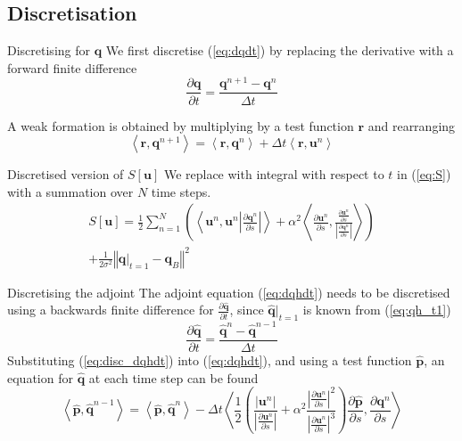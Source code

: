 \documentclass{beamer}
\newcommand{\eq}[1]{(\ref{eq:#1})}
\newcommand{\vect}[1]{\ensuremath{\mathbf{#1}}}
\newcommand{\hvect}[1]{\ensuremath{\hat{\vect{#1}}}}
\newcommand{\pp}[2]{\frac{\partial #1}{\partial #2}}
\newcommand{\angles}[1]{\left\langle #1 \right\rangle}
\begin{document}
\subsection{Discretisation}
\begin{frame}{Discretising for $\vect q$}
We first discretise \eq{dqdt} by replacing the derivative with a forward finite
difference
\begin{equation}
  \label{eq:disc_dqdt}
  \pp{\vect q}{t} = \frac{\vect q^{n+1} - \vect q^n}{\Delta t}
\end{equation}

A weak formation is obtained by multiplying by a test function $\vect r$ and
rearranging
\begin{equation}
  \label{eq:disc_q}
  \angles{\vect r, \vect q^{n+1}} = \angles{\vect r, \vect q^n} + \Delta t
    \angles{\vect r, \vect u^n}
\end{equation}

\end{frame}
\begin{frame}{Discretised version of $S[\vect u]$}
We replace with integral with respect to $t$ in \eq{S} with a summation over $N$ time steps.
\begin{equation}
\begin{split}
  \label{eq:S_disc}
  S[\vect u] = \frac{1}{2} \displaystyle \sum_{n=1}^N   \left( 
    \angles{\vect u^n, \vect u^n \left| \pp{\vect q^n}{s} \right|}  + 
  \alpha^2 
  \angles{\pp{\vect u^n}{s}, 
    \frac{\pp{\vect u^n}{s}}{\left|\pp{\vect q^n}{s}\right|}}\right)\\
  + \frac{1}{2\sigma^2}\left\Vert \vect q\big|_{t=1} - \vect q_B\right\Vert^2
\end{split}
\end{equation}
\end{frame}

\begin{frame}{Discretising the adjoint}
The adjoint equation \eq{dqhdt} needs to be discretised
using a backwards finite difference for $\pp{\hvect q}{t}$, since $\hvect
q\big|_{t=1}$ is known from \eq{qh_t1}
\begin{equation}
  \label{eq:disc_dqhdt}
  \pp{\hvect q}{t} = \frac{\hvect q^{n} - \hvect q^{n-1}}{\Delta t}
\end{equation}
Substituting \eq{disc_dqhdt} into \eq{dqhdt}, and using a test function $\hvect
p$, an equation for $\hvect q$ at each time step can be found
\begin{equation}
  \label{eq:disc_qh}
  \angles{\hvect p, \hvect q^{n-1}} = \angles{\hvect p, \hvect q^{n}} - 
  \Delta t\angles{\frac{1}{2}\left(\frac{\left|\vect u^n\right|}{\left|\pp{\vect
            u^n}{s}\right|} + \alpha^2\frac{\left|\pp{\vect
            u^n}{s}\right|^2}{\left|\pp{\vect u^n}{s}\right|^3}\right)\pp{\hvect p}{s}, \pp{\vect q^n}{s}}
  \end{equation}
\end{frame}
\end{document}
